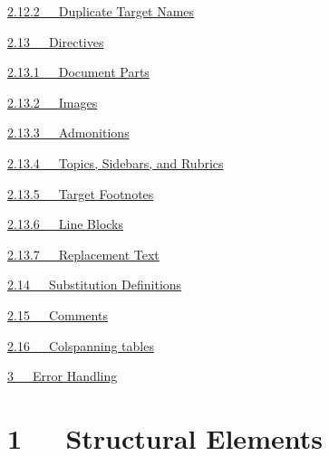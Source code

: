 \documentclass[10pt,english]{article}
\begin{document}
\begin{list}{}{}
\begin{list}{}{}
\begin{list}{}{}
\item {} \href{\#id18}{2.12.2~~~Duplicate Target Names}

\end{list}

\item {} \href{\#directives}{2.13~~~Directives}
\begin{list}{}{}
\item {} \href{\#document-parts}{2.13.1~~~Document Parts}

\item {} \href{\#images}{2.13.2~~~Images}

\item {} \href{\#admonitions}{2.13.3~~~Admonitions}

\item {} \href{\#topics-sidebars-and-rubrics}{2.13.4~~~Topics, Sidebars, and Rubrics}

\item {} \href{\#target-footnotes}{2.13.5~~~Target Footnotes}

\item {} \href{\#line-blocks}{2.13.6~~~Line Blocks}

\item {} \href{\#replacement-text}{2.13.7~~~Replacement Text}

\end{list}

\item {} \href{\#substitution-definitions}{2.14~~~Substitution Definitions}

\item {} \href{\#comments}{2.15~~~Comments}

\item {} \href{\#colspanning-tables}{2.16~~~Colspanning tables}

\end{list}

\item {} \href{\#error-handling}{3~~~Error Handling}

\end{list}




\hypertarget{structural-elements}{}
\section*{1~~~Structural Elements}
\end{document}
